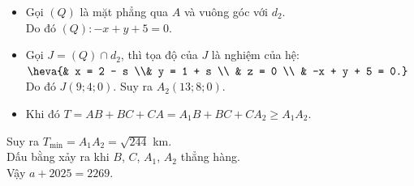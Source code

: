 \begin{bt}
{\begin{itemize}
			Do đó  $I(3; -1; 0)$. Suy ra $A_1(1; -2; 0)$.
			\item Gọi $(Q)$ là mặt phẳng qua $A$ và vuông góc với  $d_2$.
			 \\
			Do đó $(Q)\colon -x + y  + 5 = 0$.
			\item Gọi $J = (Q)  \cap d_2$, thì tọa độ của $J$ là nghiệm của hệ:
			$\heva{& x = 2 - s  \\& y = 1 + s \\ & z = 0 \\ & -x + y + 5 = 0.}$\\
			Do đó $J(9; 4; 0)$. Suy ra  $A_2(13; 8; 0)$.
			\item Khi đó $T = AB  + BC + CA = A_1B + BC + CA_2 \geq A_1A_2$.
		\end{itemize}
		Suy ra $T_{\min\limits} = A_1A_2 = \sqrt{244}$  km.\\
		Dấu bằng xảy ra khi $B$, $C$, $A_1$, $A_2$  thẳng hàng.\\
	 Vậy $a + 2025 = 2269$.}
\end{bt}

